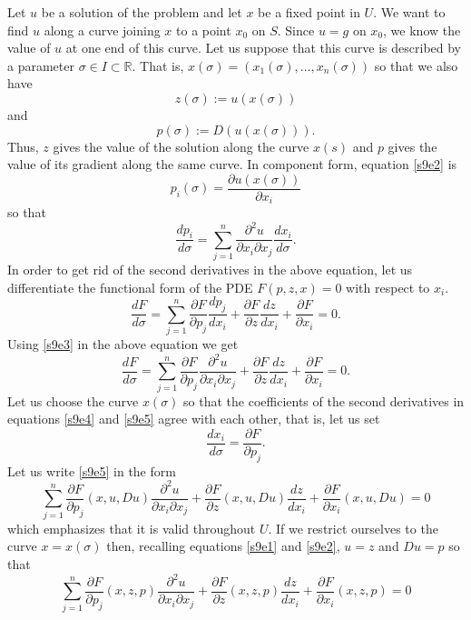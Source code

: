 \documentclass{article}
\newcommand{\td}[2]{\frac{d{#1}}{d{#2}}}
\newcommand{\pd}[2]{\frac{\partial{#1}}{\partial{#2}}}
\theoremstyle{plain}
\numberwithin{thm}{section}
\theoremstyle{plain}
\numberwithin{prop}{section}
\theoremstyle{definition}
\numberwithin{defn}{section}
\theoremstyle{remark}
\numberwithin{equation}{section}
\begin{document}
Let $u$ be a solution of the problem and let $x$ be a fixed point in $U$. We want to find $u$
along a curve joining $x$ to a point $x_0$ on $S$. Since $u = g$ on $x_0$, we know the value of
$u$ at one end of this curve. Let us suppose that this curve is described by a parameter $\sigma
\in I \subset \mathbb{R}$. That is, $x(\sigma) = (x_1(\sigma), \ldots, x_n(\sigma))$ so that we
also have
\begin{equation}\label{s9e1}
z(\sigma) := u(x(\sigma))
\end{equation}
and
\begin{equation}\label{s9e2}
p(\sigma) := D(u(x(\sigma))).
\end{equation}
Thus, $z$ gives the value of the solution along the curve $x(s)$ and $p$ gives the value of its 
gradient along the same curve. In component form, equation \eqref{s9e2} is
\begin{equation}\label{s9e3}
p_i(\sigma) = \pd{u(x(\sigma))}{x_i}
\end{equation}
so that
\begin{equation}\label{s9e4}
\td{p_i}{\sigma} = \sum_{j=1}^n\frac{\partial^2 u}{\partial x_i \partial x_j}\td{x_i}{\sigma}.
\end{equation}
In order to get rid of the second derivatives in the above equation, let us differentiate the 
functional form of the PDE $F(p, z, x) = 0$ with respect to $x_i$.
\[
\td{F}{\sigma} = \sum_{j=1}^n\pd{F}{p_j}\td{p_j}{x_i} + \pd{F}{z}\td{z}{x_i} + \pd{F}{x_i} = 0.
\]
Using \eqref{s9e3} in the above equation we get
\begin{equation}\label{s9e5}
\td{F}{\sigma} = \sum_{j=1}^n\pd{F}{p_j}\frac{\partial^2 u}{\partial x_i \partial x_j} + 
\pd{F}{z}\td{z}{x_i} + \pd{F}{x_i} = 0.
\end{equation}
Let us choose the curve $x(\sigma)$ so that the coefficients of the second derivatives in
equations \eqref{s9e4} and \eqref{s9e5} agree with each other, that is, let us set
\begin{equation}\label{s9e6}
\td{x_i}{\sigma} = \pd{F}{p_j}.
\end{equation}
Let us write \eqref{s9e5} in the form
\[
\sum_{j=1}^n\pd{F}{p_j}(x, u, Du)\frac{\partial^2 u}{\partial x_i \partial x_j} + 
\pd{F}{z}(x, u, Du)\td{z}{x_i} + \pd{F}{x_i}(x, u, Du) = 0
\]
which emphasizes that it is valid throughout $U$. If we restrict ourselves to the curve $x = 
x(\sigma)$ then, recalling equations \eqref{s9e1} and \eqref{s9e2}, $u = z$ and $Du = p$ so that
\begin{equation}\label{s9e7}
\sum_{j=1}^n\pd{F}{p_j}(x, z, p)\frac{\partial^2 u}{\partial x_i \partial x_j} + 
\pd{F}{z}(x, z, p)\td{z}{x_i} + \pd{F}{x_i}(x, z, p) = 0
\end{equation}
\end{document}
